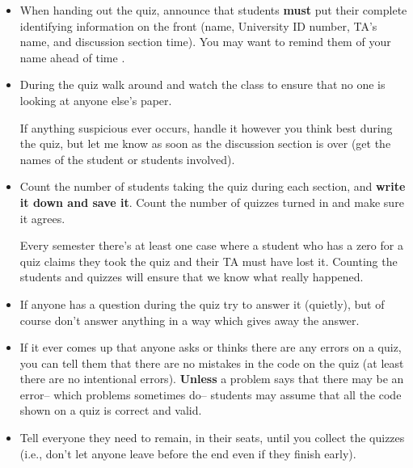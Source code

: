 \documentclass[12pt]{article}
\begin{document}
\begin{itemize}
        \item When handing out the quiz, announce that students
              \textbf{must} put their complete identifying information on
              the front (name, University ID number, TA's name, and
              discussion section time).  You may want to remind them of your
              name ahead of time \smiley.
  
        \item During the quiz walk around and watch the class to ensure that
              no one is looking at anyone else's paper.
  
              If anything suspicious ever occurs, handle it however you
              think best during the quiz, but let me know as soon as the
              discussion section is over (get the names of the student or
              students involved).
  
        \item Count the number of students taking the quiz during each
              section, and \textbf{write it down and save it}.  Count the
              number of quizzes turned in and make sure it agrees.
  
              Every semester there's at least one case where a student who
              has a zero for a quiz claims they took the quiz and their TA
              must have lost it.  Counting the students and quizzes will
              ensure that we know what really happened.
  
        \item If anyone has a question during the quiz try to answer it
              (quietly), but of course don't answer anything in a way which
              gives away the answer.
  
        \item If it ever comes up that anyone asks or thinks there are any
              errors on a quiz, you can tell them that there are no mistakes
              in the code on the quiz (at least there are no intentional
              errors).  \textbf{Unless} a problem says that there may be an
              error-- which problems sometimes do-- students may assume that
              all the code shown on a quiz is correct and valid.
  
        \item Tell everyone they need to remain, in their seats, until you
              collect the quizzes (i.e., don't let anyone leave before the
              end even if they finish early).
  

\end{itemize}
\end{document}
